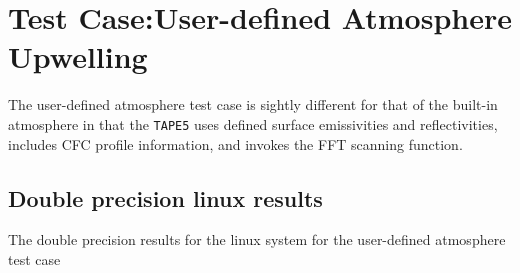 \section{Test Case:User-defined Atmosphere Upwelling}

The user-defined atmosphere test case is sightly different for that of the built-in atmosphere in that the \texttt{TAPE5} uses defined surface emissivities and reflectivities, includes CFC profile information, and invokes the FFT scanning function.

\subsection{Double precision linux results}
The double precision results for the linux system for the user-defined atmosphere test case
